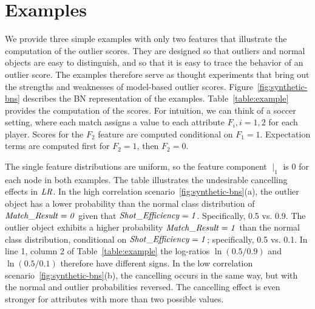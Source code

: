 \documentclass[conference]{IEEEtran}
\begin{document}
\section{Examples} \label{sec:divergence-examples} 


We provide three simple examples with only two features that illustrate the computation of the outlier scores. They are designed so that outliers and normal objects are easy to distinguish, and so that it is easy to trace the behavior of an outlier score.
The examples therefore serve as thought experiments that bring out the strengths and weaknesses of model-based outlier scores. 
Figure~\ref{fig:synthetic-bns} describes the BN representation of the examples. Table~\ref{table:example} provides the computation of the scores. For intuition, we can think of a soccer setting, where each match assigns a value to each attribute $F_i, i =  1,2$ for each player. 
Scores for the $F_{2}$ feature are computed conditional on $F_{1} = 1$. Expectation terms are computed first for $F_{2} = 1$, then $F_{2} = 0$. 

The single feature distributions are uniform, so the feature component $\mid_{1}$ 
		is 0 for each node in both examples.
% 
The table illustrates the undesirable cancelling effects in $\it{LR}$. In the high correlation scenario~\ref{fig:synthetic-bns}(a), the outlier object has a lower probability than the normal class distribution of $\it{Match\_Result} = 0$ given that $\it{Shot\_Efficiency} = 1$. Specifically, 0.5 vs. 0.9. The outlier object exhibits a higher probability $\it{Match\_Result} = 1$ than the normal class distribution, conditional on $\it{Shot\_Efficiency} = 1$; specifically, 0.5 vs. 0.1. In line 1, column 2 of Table~\ref{table:example}  the log-ratios $\ln(0.5/0.9)$ and $\ln(0.5/0.1)$ therefore have different signs. In the low correlation scenario~\ref{fig:synthetic-bns}(b), the cancelling occurs in the same way, but with the normal and outlier probabilities reversed. 
The cancelling effect is even stronger for attributes with more than two possible values.
\end{document}

